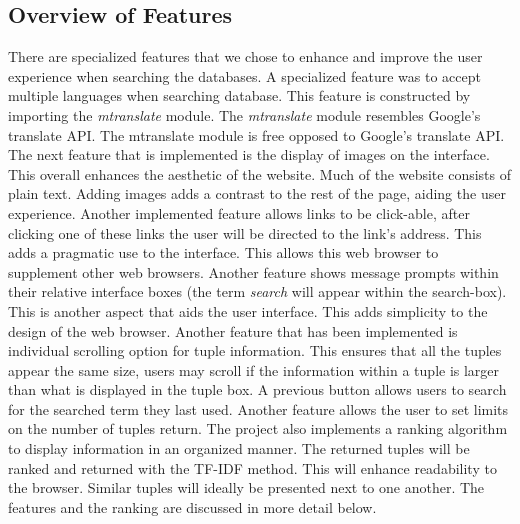 \documentclass{sig-alternate-05-2015}
\begin{document}
\subsection{Overview of Features}
There are specialized features that we chose to enhance and improve the user experience when searching the databases. A specialized feature was to accept multiple languages when searching database. This feature is constructed by importing the \textit{mtranslate}\cite{mtranslate} module. The \textit{mtranslate}\cite{mtranslate} module resembles Google's translate API. The mtranslate module is free opposed to Google's translate API. The next feature that is implemented is the display of images on the interface. This overall enhances the aesthetic of the website. Much of the website consists of plain text. Adding images adds a contrast to the rest of the page, aiding the user experience. Another implemented feature allows links to be click-able, after clicking one of these links the user will be directed to the link's address. This adds a pragmatic use to the interface. This allows this web browser to supplement other web browsers. Another feature shows message prompts within their relative interface boxes (the term \textit{search} will appear within the search-box). This is another aspect that aids the user interface. This adds simplicity to the design of the web browser. Another feature that has been implemented is individual scrolling option for tuple information. This ensures that all the tuples appear the same size, users may scroll if the information within a tuple is larger than what is displayed in the tuple box. A previous button allows users to search for the searched term they last used. Another  feature allows the user to set limits on the number of tuples return. The project also implements a ranking algorithm to display information in an organized manner. The returned tuples will be ranked and returned with the TF-IDF method. This will enhance readability to the browser. Similar tuples will ideally be presented next to one another. The features and the ranking are discussed in more detail below.
\end{document}
